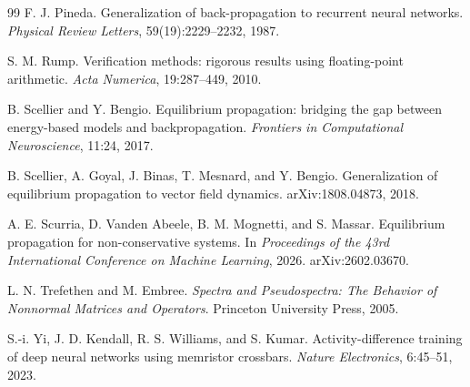 \documentclass[11pt]{article}
\theoremstyle{definition}
\theoremstyle{remark}
\begin{document}
\begin{thebibliography}{99}
 F. J. Pineda. Generalization of back-propagation to recurrent neural
networks. \emph{Physical Review Letters}, 59(19):2229--2232, 1987.

 S. M. Rump. Verification methods: rigorous results using floating-point
arithmetic. \emph{Acta Numerica}, 19:287--449, 2010.

 B. Scellier and Y. Bengio. Equilibrium propagation: bridging the gap
between energy-based models and backpropagation. \emph{Frontiers in Computational Neuroscience},
11:24, 2017.

 B. Scellier, A. Goyal, J. Binas, T. Mesnard, and Y. Bengio. Generalization
of equilibrium propagation to vector field dynamics. arXiv:1808.04873, 2018.

 A. E. Scurria, D. Vanden Abeele, B. M. Mognetti, and S. Massar. Equilibrium
propagation for non-conservative systems. In \emph{Proceedings of the 43rd International
Conference on Machine Learning}, 2026. arXiv:2602.03670.

 L. N. Trefethen and M. Embree. \emph{Spectra and Pseudospectra: The
Behavior of Nonnormal Matrices and Operators}. Princeton University Press, 2005.

 S.-i. Yi, J. D. Kendall, R. S. Williams, and S. Kumar. Activity-difference
training of deep neural networks using memristor crossbars. \emph{Nature Electronics}, 6:45--51,
2023.

\end{thebibliography}
\end{document}
